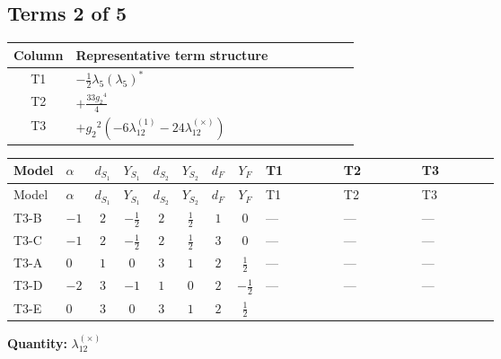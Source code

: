 \documentclass[8pt]{article}
\begin{document}
\begin{landscape}
\subsection*{Terms 2 of 5}
\begin{center}
\begin{tabular}{@{}c >{\raggedright\arraybackslash}p{0.82\linewidth}@{}}
\toprule
Column & Representative term structure \\
\midrule
T1 & \(\displaystyle -\frac{1}{2} {\lambda_5} \left({\lambda_5}\right)^{*}\) \\
\midrule
T2 & \(\displaystyle +\frac{33 {g_2}^4}{4}\) \\
\midrule
T3 & \(\displaystyle +{g_2}^2 (-6 {\lambda_{12}^{(1)}}-24 {\lambda_{12}^{(\times)}})\) \\
\midrule
\bottomrule
\end{tabular}
\end{center}
\smallskip
\tiny
\begin{longtable}{@{}llcccccc >{\raggedright\arraybackslash}p{0.21\linewidth} >{\raggedright\arraybackslash}p{0.21\linewidth} >{\raggedright\arraybackslash}p{0.21\linewidth}@{}}
\toprule
Model & $\alpha$ & $d_{S_1}$ & $Y_{S_1}$ & $d_{S_2}$ & $Y_{S_2}$ & $d_F$ & $Y_F$ & T1 & T2 & T3 \\
\midrule
\endfirsthead
\toprule
Model & $\alpha$ & $d_{S_1}$ & $Y_{S_1}$ & $d_{S_2}$ & $Y_{S_2}$ & $d_F$ & $Y_F$ & T1 & T2 & T3 \\
\midrule
\endhead
T3-B & $-1$ & $2$ & $-\frac{1}{2}$ & $2$ & $\frac{1}{2}$ & $1$ & $0$ & --- & --- & --- \\
\midrule
T3-C & $-1$ & $2$ & $-\frac{1}{2}$ & $2$ & $\frac{1}{2}$ & $3$ & $0$ & --- & --- & --- \\
\midrule
T3-A & $0$ & $1$ & $0$ & $3$ & $1$ & $2$ & $\frac{1}{2}$ & --- & --- & --- \\
\midrule
T3-D & $-2$ & $3$ & $-1$ & $1$ & $0$ & $2$ & $-\frac{1}{2}$ & --- & --- & --- \\
\midrule
T3-E & $0$ & $3$ & $0$ & $3$ & $1$ & $2$ & $\frac{1}{2}$ & \scriptsize\adjustbox{max width=\linewidth}{$\begin{gathered} -\frac{1}{2} {\lambda_5} \left({\lambda_5}\right)^{*}\end{gathered}$} & \scriptsize\adjustbox{max width=\linewidth}{$\begin{gathered} +\frac{33 {g_2}^4}{4}\end{gathered}$} & \scriptsize\adjustbox{max width=\linewidth}{$\begin{gathered} +{g_2}^2 (-6 {\lambda_{12}^{(1)}}-24 {\lambda_{12}^{(\times)}})\end{gathered}$} \\
\midrule
\bottomrule
\end{longtable}
\clearpage
\noindent\textbf{Quantity: }$\lambda_{12}^{(\times)}$\par\smallskip

\end{landscape}
\end{document}
